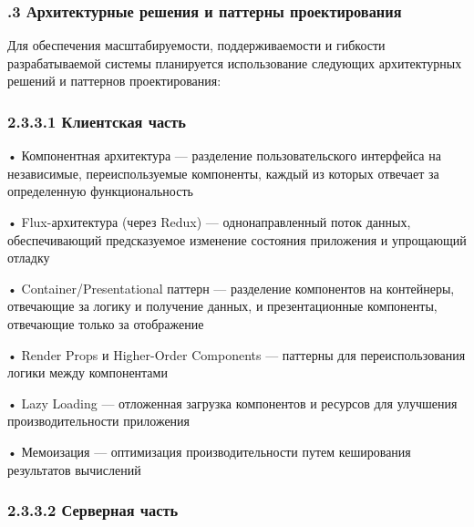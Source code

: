 \subtitlespace

\subsubsection*{ 
  \gostTitleFont
  .3 Архитектурные решения и паттерны проектирования
} 

\subtitlespace

{\gostFont

  \par \redline Для обеспечения масштабируемости, поддерживаемости и гибкости разрабатываемой системы планируется использование следующих архитектурных решений и паттернов проектирования:

  \subsubsection*{2.3.3.1 Клиентская часть}

  \par \redline • Компонентная архитектура — разделение пользовательского интерфейса на независимые, переиспользуемые компоненты, каждый из которых отвечает за определенную функциональность
  \par \redline • Flux-архитектура (через Redux) — однонаправленный поток данных, обеспечивающий предсказуемое изменение состояния приложения и упрощающий отладку
  \par \redline • Container/Presentational паттерн — разделение компонентов на контейнеры, отвечающие за логику и получение данных, и презентационные компоненты, отвечающие только за отображение
  \par \redline • Render Props и Higher-Order Components — паттерны для переиспользования логики между компонентами
  \par \redline • Lazy Loading — отложенная загрузка компонентов и ресурсов для улучшения производительности приложения
  \par \redline • Мемоизация — оптимизация производительности путем кеширования результатов вычислений

  \subsubsection*{2.3.3.2 Серверная часть}

}
